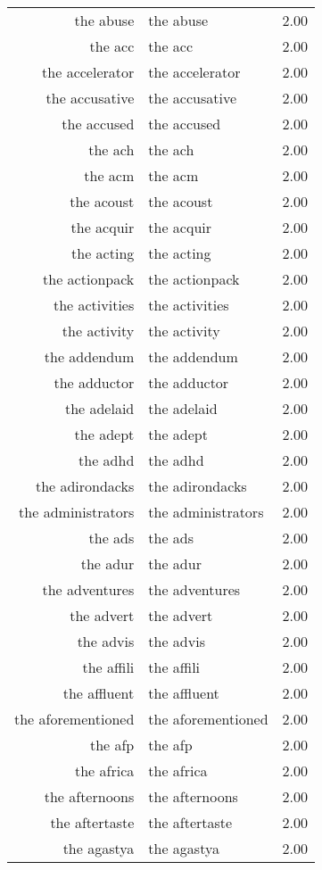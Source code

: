 \begin{table}[ht]
\begin{tabular}{rlr}
  the abuse & the abuse & 2.00 \\ 
  the acc & the acc & 2.00 \\ 
  the accelerator & the accelerator & 2.00 \\ 
  the accusative & the accusative & 2.00 \\ 
  the accused & the accused & 2.00 \\ 
  the ach & the ach & 2.00 \\ 
  the acm & the acm & 2.00 \\ 
  the acoust & the acoust & 2.00 \\ 
  the acquir & the acquir & 2.00 \\ 
  the acting & the acting & 2.00 \\ 
  the actionpack & the actionpack & 2.00 \\ 
  the activities & the activities & 2.00 \\ 
  the activity & the activity & 2.00 \\ 
  the addendum & the addendum & 2.00 \\ 
  the adductor & the adductor & 2.00 \\ 
  the adelaid & the adelaid & 2.00 \\ 
  the adept & the adept & 2.00 \\ 
  the adhd & the adhd & 2.00 \\ 
  the adirondacks & the adirondacks & 2.00 \\ 
  the administrators & the administrators & 2.00 \\ 
  the ads & the ads & 2.00 \\ 
  the adur & the adur & 2.00 \\ 
  the adventures & the adventures & 2.00 \\ 
  the advert & the advert & 2.00 \\ 
  the advis & the advis & 2.00 \\ 
  the affili & the affili & 2.00 \\ 
  the affluent & the affluent & 2.00 \\ 
  the aforementioned & the aforementioned & 2.00 \\ 
  the afp & the afp & 2.00 \\ 
  the africa & the africa & 2.00 \\ 
  the afternoons & the afternoons & 2.00 \\ 
  the aftertaste & the aftertaste & 2.00 \\ 
  the agastya & the agastya & 2.00 \\ 

\end{tabular}
\end{table}

